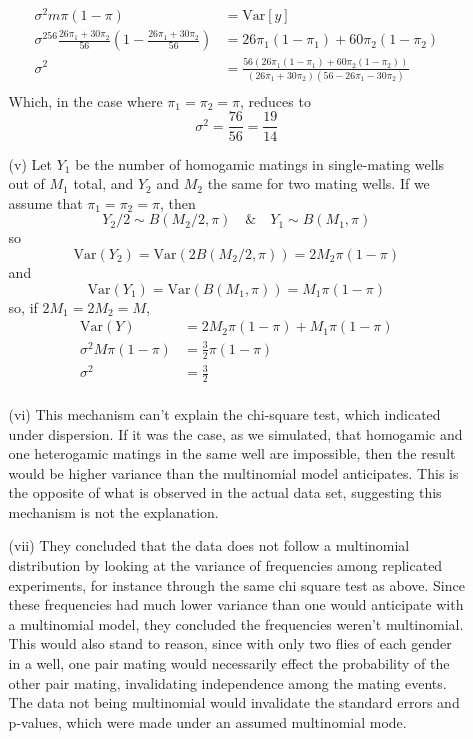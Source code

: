 \documentclass[11pt]{article}
\newcommand{\var}{\mathrm{Var}}
\theoremstyle{definition}
\begin{document}
\begin{itemize}
\begin{itemize}
\begin{align*}
                    \sigma^2m\pi(1-\pi) &= \var[y] \\
                    \sigma^256\frac{26\pi_1 + 30\pi_2}{56}\left(1-\frac{26\pi_1 + 30\pi_2}{56}\right) &= 26\pi_1(1-\pi_1) + 60\pi_2(1-\pi_2)\\
                    \sigma^2&= \frac{56(26\pi_1(1-\pi_1) + 60\pi_2(1-\pi_2))}{(26\pi_1 + 30\pi_2)(56-26\pi_1 - 30\pi_2)}\\
                \end{align*}
                Which, in the case where $\pi_1=\pi_2=\pi$, reduces to 
                \[ \sigma^2 = \frac{76}{56} = \frac{19}{14}\]
            \item[(v)]
                Let $Y_1$ be the number of homogamic matings in single-mating wells out of $M_1$ total,  and $Y_2$ and $M_2$ the same for two mating wells. If we assume that $\pi_1=\pi_2=\pi$, then 
                \[ Y_2/2 \sim B(M_2/2,\pi) \quad \&\quad Y_1 \sim B(M_1,\pi)\]
                so 
                \[\var(Y_2) = \var(2B(M_2/2,\pi)) = 2M_2\pi(1-\pi)\]
                and 
                \[\var(Y_1) = \var(B(M_1,\pi)) = M_1\pi(1-\pi)\]
                so, if $2M_1=2M_2=M$,
                \begin{align*}
                    \var(Y) &= 2M_2\pi(1-\pi)+M_1\pi(1-\pi) \\
                    \sigma^2M\pi(1-\pi) &= \frac{3}{2}\pi(1-\pi) \\
                    \sigma^2 &= \frac{3}{2} \\
                \end{align*}
            \item[(vi)]
                This mechanism can't explain the chi-square test, which indicated under dispersion. If it was the case, as we simulated, that  homogamic and one heterogamic matings in the same well are impossible, then the result would be higher variance than the multinomial model anticipates. This is the opposite of what is observed in the actual data set, suggesting this mechanism is not the explanation.  
            \item[(vii)]
                They concluded that the data does not follow a multinomial distribution by looking at the variance of frequencies among replicated experiments, for instance through the same chi square test as above. Since these frequencies had much lower variance than one would anticipate with a multinomial model, they concluded the frequencies weren't multinomial. This would also stand to reason, since with only two flies of each gender in a well, one pair mating would necessarily effect the probability of the other pair mating, invalidating independence among the mating events. The data not being multinomial would invalidate the standard errors and p-values, which were made under an assumed multinomial mode.

\end{itemize}
\end{itemize}
\end{document}
